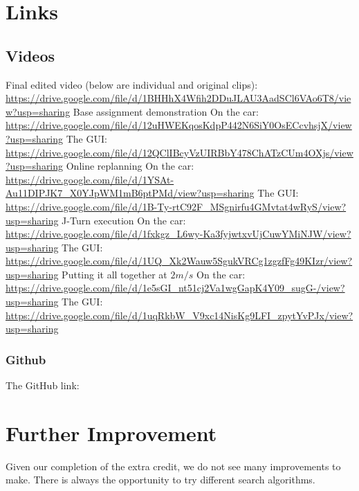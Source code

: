 \documentclass[12pt]{article}
\begin{document}
\maketitle













\section{Links}

\subsection{Videos}
\label{vids}

\begin{outline}[enumerate]
	\1 Final edited video (below are individual and original clips): \url{https://drive.google.com/file/d/1BHHhX4Wfih2DDuJLAU3AadSCl6VAo6T8/view?usp=sharing}
	\1 Base assignment demonstration 
      \2 On the car: \url{https://drive.google.com/file/d/12uHWEKqosKdpP442N6SiY0OsECcvhsjX/view?usp=sharing}
      \2 The GUI: \url{https://drive.google.com/file/d/12QClIBcyVzUIRBbY478ChATzCUm4OXjs/view?usp=sharing}
   \1 Online replanning 
     \2 On the car: \url{https://drive.google.com/file/d/1YSAt-Au11DIPJK7\_X0YJpWM1mB6ptPMd/view?usp=sharing}
     \2 The GUI: \url{https://drive.google.com/file/d/1B-Ty-rtC92F\_MSgnirfu4GMvtat4wRyS/view?usp=sharing}
   \1 J-Turn execution 
     \2 On the car: \url{https://drive.google.com/file/d/1fxkgz\_L6wy-Ka3fyjwtxvUjCuwYMiNJW/view?usp=sharing}
     \2 The GUI: \url{https://drive.google.com/file/d/1UQ\_Xk2Wauw5SgukVRCg1zgzfFg49KIzr/view?usp=sharing}
   \1 Putting it all together at $2 m/s$ \label{wowus}
     \2 On the car: \url{https://drive.google.com/file/d/1e5sGI\_nt51cj2Va1wgGapK4Y09\_sugG-/view?usp=sharing}
     \2 The GUI: \url{https://drive.google.com/file/d/1uqRkbW\_V9xc14NisKg9LFI\_zpytYvPJx/view?usp=sharing}
\end{outline}

\subsubsection{Github}
The GitHub link:

\section{Further Improvement}
Given our completion of the extra credit, we do not see many improvements to make. There is always the opportunity to try different search algorithms. 
\end{document}
